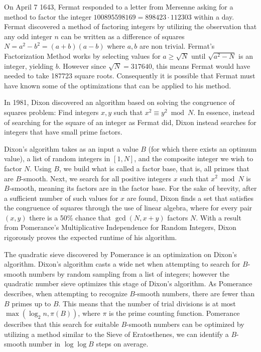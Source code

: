 \documentclass[12pt]{amsart}
\theoremstyle{definition}
\begin{document}
On April 7 1643, Fermat responded to a letter from Mersenne asking for a method to factor the integer $100895598169=898423\cdot 112303$ within a day. Fermat discovered a method of factoring integers by utilizing the observation that any odd integer $n$ can be written as a difference of squares $N=a^2-b^2=(a+b)(a-b)$ where $a,b$ are non trivial. Fermat's Factorization Method works by selecting values for $a\geq\sqrt{N}$ until $\sqrt{a^2-N}$ is an integer, yielding $b$. However since
$\sqrt{N}=317640$, this means Fermat would have needed to take 187723 square roots. Consequently it is possible that Fermat must have known some of the optimizations that can be applied to his method.


In 1981, Dixon discovered an algorithm based on solving the congruence of squares problem: Find integers $x,y$ such that $x^2\equiv y^2 \bmod N$. In essence, instead of searching for the square of an integer as Fermat did, Dixon instead searches for integers that have small prime factors. 

Dixon's algorithm takes as an input a value $B$ (for which there exists an optimum value), a list of random integers in $[1,N]$, and the composite integer we wish to factor $N$. Using $B$, we build what is called a factor base, that is, all primes that are $B$-smooth. Next, we search for all positive integers $x$ such that $x^2 \bmod N$ is $B$-smooth, meaning its factors are in the factor base. For the sake of brevity, after a sufficient number of such values for $x$ are found, Dixon finds a set that satisfies the congruence of squares through the use of linear algebra, where for every pair $(x,y)$ there is a 50\% chance that $\gcd(N, x+y)$ factors $N$. With a result from Pomerance's Multiplicative Independence for Random Integers, Dixon rigorously proves the expected runtime of his algorithm.

The quadratic sieve discovered by Pomerance is an optimization on Dixon's algorithm. Dixon's algorithm casts a wide net when attempting to search for $B$-smooth numbers by random sampling from a list of integers; however the quadratic number sieve optimizes this stage of Dixon's algorithm. As Pomerance describes, when attempting to recognize $B$-smooth numbers, there are fewer than $B$ primes up to $B$. This means that the number of trial divisions is at most $\max(\log_2{n}, \pi(B))$, where $\pi$ is the prime counting function. Pomerance describes that this search for suitable $B$-smooth numbers can be optimized by utilizing a method similar to the Sieve of Eratosthenes, we can identify a $B$-smooth number in $\log\log B$ steps on average.
\end{document}
